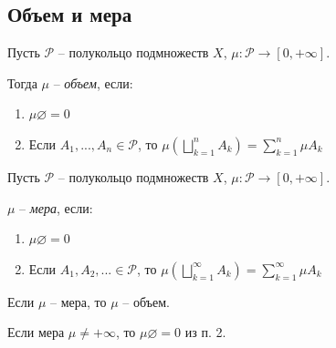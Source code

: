 \subsection{Объем и мера}

\begin{definition}
    Пусть $\mathcal{P}$ – полукольцо подмножеств $X$, $\mu: \mathcal{P} \rightarrow [0, +\infty]$.

    Тогда $\mu$ – \textit{объем}, если:
    \begin{enumerate}
        \item $\mu \varnothing = 0$
        \item Если $A_1, ..., A_n \in \mathcal{P}$, то $\mu(\bigsqcup\limits_{k=1}^n A_k)=\sum \limits_{k=1}^n \mu A_k$
    \end{enumerate}
\end{definition}

\begin{definition}
    Пусть $\mathcal{P}$ – полукольцо подмножеств $X$, $\mu: \mathcal{P} \rightarrow [0, +\infty]$.

    $\mu$ – \textit{мера}, если:
    \begin{enumerate}
        \item $\mu \varnothing = 0$
        \item Если $A_1, A_2, ... \in \mathcal{P}$, то $\mu(\bigsqcup\limits_{k=1}^\infty A_k)=\sum \limits_{k=1}^\infty \mu A_k$
    \end{enumerate}
\end{definition}

\begin{remark} 
    Если $\mu$ – мера, то $\mu$ – объем.
\end{remark}

\begin{exercise}
    Если мера $\mu \not = +\infty$, то $\mu \varnothing = 0$ из п. 2.
\end{exercise}

